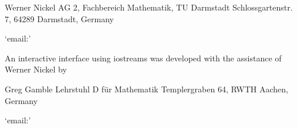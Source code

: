\begintt
Werner Nickel
AG 2, Fachbereich Mathematik, TU Darmstadt
Schlossgartenstr. 7, 64289 Darmstadt, Germany
\endtt

{}`email:' 

An  interactive  interface  using  iostreams  was  developed   with   the
assistance of Werner Nickel by

\begintt
Greg Gamble
Lehrstuhl D f\"ur Mathematik
Templergraben 64, RWTH Aachen, Germany
\endtt

{}`email:' 


